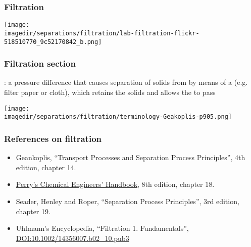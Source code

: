 

\begin{frame}\frametitle{Filtration}
	\begin{center}
		\texttt{[image: \\imagedir/separations/filtration/lab-filtration-flickr-518510770\_9c52170842\_b.png]}
	\end{center}
\end{frame}

\begin{frame}\frametitle{Filtration section}
	{\color{purple}{Filtration}}: a pressure difference that causes separation of solids from {\color{purple}{slurry}} by means of a {\color{purple}{porous medium}} (e.g. filter paper or cloth), which retains the solids and allows the {\color{purple}{filtrate}} to pass

	\begin{center}
		\texttt{[image: \\imagedir/separations/filtration/terminology-Geakoplis-p905.png]}
	\end{center}
\end{frame}

\begin{frame}\frametitle{References on filtration}
	\begin{itemize}
		\item	Geankoplis, ``Transport Processes and Separation Process Principles'', 4th edition, chapter 14.
		\item	\href{http://accessengineeringlibrary.com/browse/perrys-chemical-engineers-handbook-eighth-edition}{Perry's Chemical Engineers' Handbook}, 8th edition, chapter 18.
		\item	Seader, Henley and Roper, ``Separation Process Principles'', 3rd edition, chapter 19.
		\item	Uhlmann's Encyclopedia, ``Filtration 1. Fundamentals'', {\tiny \href{http://onlinelibrary.wiley.com/doi/10.1002/14356007.b02\_10.pub3/abstract}{DOI:10.1002/14356007.b02\_10.pub3}}
	\end{itemize}
\end{frame}

